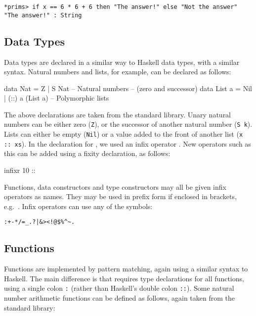 \begin{lstlisting}[style=stdout]
*prims> if x == 6 * 6 + 6 then "The answer!" else "Not the answer"
"The answer!" : String
\end{lstlisting}

\subsection{Data Types}

Data types are declared in a similar way to Haskell data types, with a similar syntax.
Natural numbers and lists, for example, can be declared as follows:

\begin{code}
data Nat    = Z   | S Nat           -- Natural numbers
                                    -- (zero and successor)
data List a = Nil | (::) a (List a) -- Polymorphic lists
\end{code}

\noindent
The above declarations are taken from the standard library.
Unary natural numbers can be either zero (\texttt{Z}), or the successor of another natural number (\texttt{S k}). 
Lists can either be empty (\texttt{Nil}) or a value added to the front of another list (\texttt{x :: xs}).
In the declaration for , we used an infix operator \tDC{::}.
New operators such as this can be added using a fixity declaration, as follows:

\begin{code}
infixr 10 :: 
\end{code}

\noindent
Functions, data constructors and type constructors may all be given infix operators as names.
They may be used in prefix form if enclosed in brackets, e.g.\ \tDC{(::)}.
Infix operators can use any of the symbols:

\begin{lstlisting}[style=stdout]
:+-*/=_.?|&><!@$%^~.
\end{lstlisting}

\subsection{Functions}

Functions are implemented by pattern matching, again using a similar syntax to Haskell.
The main difference is that \Idris{} requires type declarations for all functions, using a single colon \texttt{:} (rather than Haskell's double colon \texttt{::}).
Some natural number arithmetic functions can be defined as follows, again taken from the standard library:

